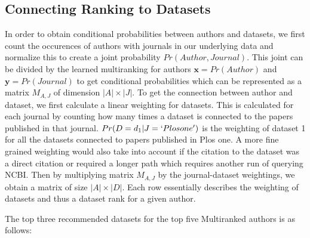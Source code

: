 \subsection{Connecting Ranking to Datasets}
In order to obtain conditional probabilities between authors and datasets, we first count the occurences of authors with journals in our underlying data and normalize this to create a joint probability $Pr(Author,Journal)$. This joint can be divided by the learned multiranking for authors $\mathbf{x} = Pr(Author)$ and $\mathbf{y}=Pr(Journal)$ to get conditional probabilities which can be represented as a matrix $M_{A,J}$ of dimension $|A|\times|J|$. To get the connection between author and dataset, we first calculate a linear weighting for datasets. This is calculated for each journal by counting how many times a dataset is connected to the papers published in that journal. $Pr(D=d_1|J=`Plos one')$ is the weighting of dataset 1 for all the datasets connected to papers published in Plos one. A more fine grained weighting would also take into account if the citation to the dataset was a direct citation or required a longer path which requires another run of querying NCBI. Then by multiplying matrix $M_{A,J}$ by the journal-dataset weightings, we obtain a matrix of size $|A|\times|D|$. Each row essentially describes the weighting of datasets and thus a dataset rank for a given author. 

The top three recommended datasets for the top five Multiranked authors is as follows:
    \begin{table}[h]
    \caption{Dataset Recommendation for Top 5 Multiranked Authors}
    \label{tab:rec}
    \end{table}